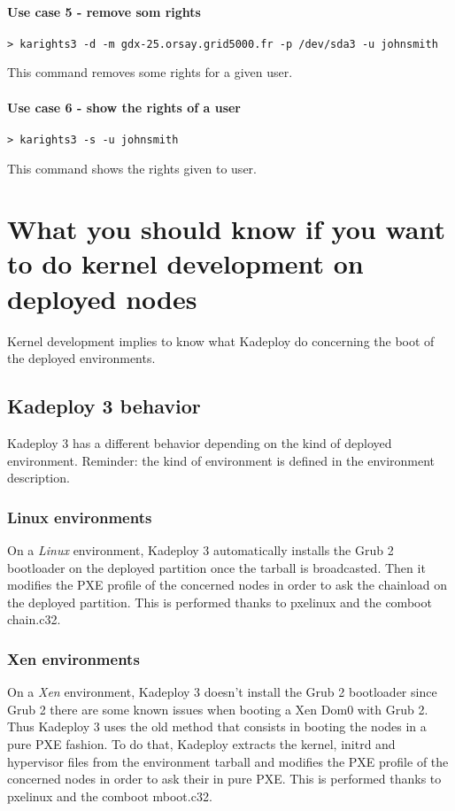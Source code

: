 \documentclass[a4wide,10pt,oneside]{book}
\begin{document}
\paragraph{Use case 5 - remove som rights}
\begin{verbatim}
> karights3 -d -m gdx-25.orsay.grid5000.fr -p /dev/sda3 -u johnsmith
\end{verbatim}
This command removes some rights for a given user.

\paragraph{Use case 6 - show the rights of a user}
\begin{verbatim}
> karights3 -s -u johnsmith
\end{verbatim}
This command shows the rights given to user.


\section{What you should know if you want to do kernel development on deployed nodes}
Kernel development implies to know what Kadeploy do concerning the boot of the deployed environments.

\subsection{Kadeploy 3 behavior}
Kadeploy 3 has a different behavior depending on the kind of deployed environment. Reminder: the kind of environment is defined in the environment description.

\subsubsection{Linux environments}
On a \emph{Linux} environment, Kadeploy 3 automatically installs the Grub 2 bootloader on the deployed partition once the tarball is broadcasted. Then it modifies the PXE profile of the concerned nodes in order to ask the chainload on the deployed partition. This is performed thanks to pxelinux and the comboot chain.c32.

\subsubsection{Xen environments}
On a \emph{Xen} environment, Kadeploy 3 doesn't install the Grub 2 bootloader since Grub 2 there are some known issues when booting a Xen Dom0 with Grub 2. Thus Kadeploy 3 uses the old method that consists in booting the nodes in a pure PXE fashion. To do that, Kadeploy extracts the kernel, initrd and hypervisor files from the environment tarball and modifies the PXE profile of the concerned nodes in order to ask their in pure PXE. This is performed thanks to pxelinux and the comboot mboot.c32.
\end{document}
